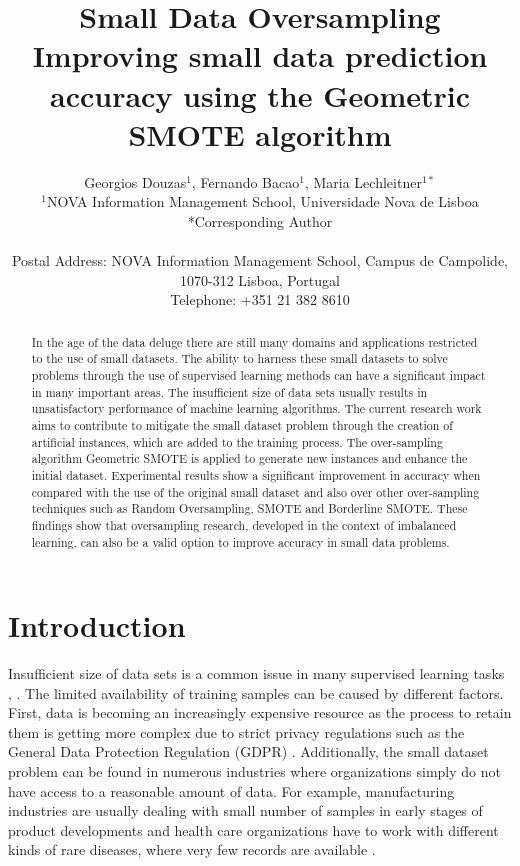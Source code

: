 \documentclass[parskip=full]{scrartcl}
\title{Small Data Oversampling  \\ \LARGE{Improving small data prediction accuracy using the Geometric SMOTE algorithm}}
\author{
	Georgios Douzas\(^{1}\), Fernando Bacao\(^{1}\), Maria Lechleitner\(^{1*}\) 
	\\
	\small{\(^{1}\)NOVA Information Management School, Universidade Nova de Lisboa}
	\\
	\small{*Corresponding Author}
	\\
	\\
	\small{Postal Address: NOVA Information Management School, Campus de Campolide, 1070-312 Lisboa, Portugal}
	\\
	\small{Telephone: +351 21 382 8610}
}
\date{}
\begin{document}
\maketitle

\begin{abstract}
In the age of the data deluge there are still many domains and applications
restricted to the use of small datasets. The ability to harness these small
datasets to solve problems through the use of supervised learning methods can
have a significant impact in many important areas. The insufficient size of data
sets usually results in unsatisfactory performance of machine learning
algorithms. The current research work aims to contribute to mitigate the small
dataset problem through the creation of artificial instances, which are added to
the training process. The over-sampling algorithm Geometric SMOTE is applied to
generate new instances and enhance the initial dataset. Experimental results
show a significant improvement in accuracy when compared with the use of the
original small dataset and also over other over-sampling techniques such as
Random Oversampling, SMOTE and Borderline SMOTE. These findings show that
oversampling research, developed in the context of imbalanced learning, can also
be a valid option to improve accuracy in small data problems.
\end{abstract}

\section{Introduction}
Insufficient size of data sets is a common issue in many supervised learning
tasks \cite{Niyogi.1998}, \cite{AbdulLateh.2017}. The limited availability of
training samples can be caused by different factors. First, data is becoming an
increasingly expensive resource \cite{Li.2007} as the process to retain them is
getting more complex due to strict privacy regulations such as the General Data
Protection Regulation (GDPR) \cite{EuropeanCommission.2019}. Additionally, the
small dataset problem can be found in numerous industries where organizations
simply do not have access to a reasonable amount of data. For example,
manufacturing industries are usually dealing with small number of samples in
early stages of product developments and health care organizations have to work
with different kinds of rare diseases, where very few records are available
\cite{AbdulLateh.2017}.
\end{document}
